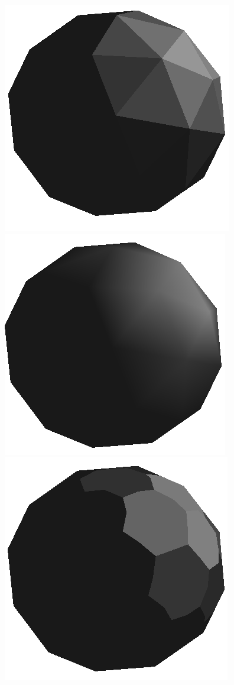 \begin{figure}[!h]
    \centering
    \centering
    \includegraphics[scale=0.5]{images/flatshading.png}
    \label{fig:flat-shading-triangle}
    \endminipage\hfill
    \centering
    \includegraphics[scale=0.5]{images/gouraudshading.png}
    \label{fig:gouraud-shading}
    \endminipage\hfill
    \centering
    \includegraphics[scale=0.5]{images/extentflatshading.png}\label{fig:flat-shading-vertex}

\end{figure}
